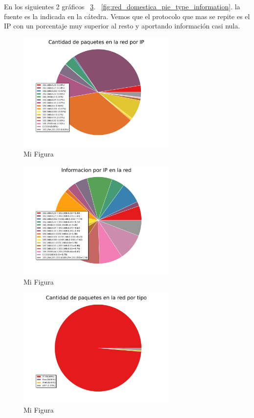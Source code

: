 En los siguientes 2 gráficos ~\ref{fig:red_domestica_pie_type}. ~\ref{fig:red_domestica_pie_type_information}. la fuente es la indicada en la cátedra. Vemos que el protocolo que mas se repite es el IP con un porcentaje muy superior al resto y aportando información casi nula. 

\begin{figure}[h!]
  \centering
   \includegraphics[width=0.7\textwidth]{graficos/red_domestica_pie_arp.png}
  \caption{Mi Figura}
  \label{fig:red_domestica_pie_arp}
\end{figure}

\begin{figure}[h!]
  \centering
   \includegraphics[width=0.7\textwidth]{graficos/red_domestica_pie_arp_information.png}
  \caption{Mi Figura}
  \label{fig:red_domestica_pie_arp_information}
\end{figure}

\begin{figure}[h!]
  \centering
   \includegraphics[width=0.7\textwidth]{graficos/red_domestica_pie_type.png}
  \caption{Mi Figura}
  \label{fig:red_domestica_pie_type}
\end{figure}

